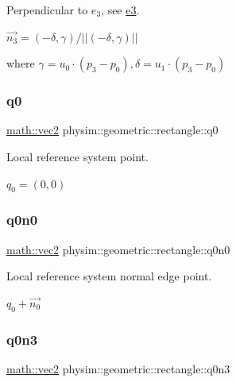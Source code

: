 Perpendicular to $e_3$, see \hyperlink{classphysim_1_1geometric_1_1rectangle_a94e615cbf893ff4950e845545796c779}{e3}.

$\vec{n_3} = (-\delta, \gamma)/ || (-\delta, \gamma) ||$

where $\gamma = u_0\cdot(p_3-p_0), \delta = u_1\cdot(p_3-p_0)$ \mbox{\label{classphysim_1_1geometric_1_1rectangle_a6597a22ccd74d61b3dd0a15585bc1f97}} 
\subsubsection{\texorpdfstring{q0}{q0}}
{\footnotesize\ttfamily \hyperlink{structphysim_1_1math_1_1vec2}{math\+::vec2} physim\+::geometric\+::rectangle\+::q0\hspace{0.3cm}{\ttfamily [private]}}



Local reference system point. 

$q_0 = (0,0)$ \mbox{\label{classphysim_1_1geometric_1_1rectangle_a6643ef4e07ab484fa12dc9e323729313}} 
\subsubsection{\texorpdfstring{q0n0}{q0n0}}
{\footnotesize\ttfamily \hyperlink{structphysim_1_1math_1_1vec2}{math\+::vec2} physim\+::geometric\+::rectangle\+::q0n0\hspace{0.3cm}{\ttfamily [private]}}



Local reference system normal edge point. 

$q_0 + \vec{n_0}$ \mbox{\label{classphysim_1_1geometric_1_1rectangle_a8d187e23082333ee1eef5877d2d541c1}} 
\subsubsection{\texorpdfstring{q0n3}{q0n3}}
{\footnotesize\ttfamily \hyperlink{structphysim_1_1math_1_1vec2}{math\+::vec2} physim\+::geometric\+::rectangle\+::q0n3\hspace{0.3cm}{\ttfamily [private]}}



